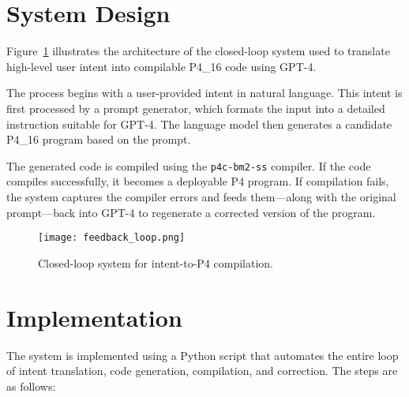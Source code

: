 \documentclass[sigconf]{acmart}
\begin{document}
\section{System Design}

Figure~\ref{fig:system-design}  illustrates the architecture of the closed-loop system used to translate high-level user intent into compilable P4\_16 code using GPT-4. 

The process begins with a user-provided intent in natural language. This intent is first processed by a prompt generator, which formats the input into a detailed instruction suitable for GPT-4. The language model then generates a candidate P4\_16 program based on the prompt.

The generated code is compiled using the \texttt{p4c-bm2-ss} compiler. If the code compiles successfully, it becomes a deployable P4 program. If compilation fails, the system captures the compiler errors and feeds them—along with the original prompt—back into GPT-4 to regenerate a corrected version of the program.


\begin{figure}[t]
    \centering
    \texttt{[image: feedback\_loop.png]}
    \caption{Closed-loop system for intent-to-P4 compilation.}
    \label{fig:system-design}
\end{figure}



\section{Implementation}

The system is implemented using a Python script that automates the entire loop of intent translation, code generation, compilation, and correction. The steps are as follows:
\end{document}
